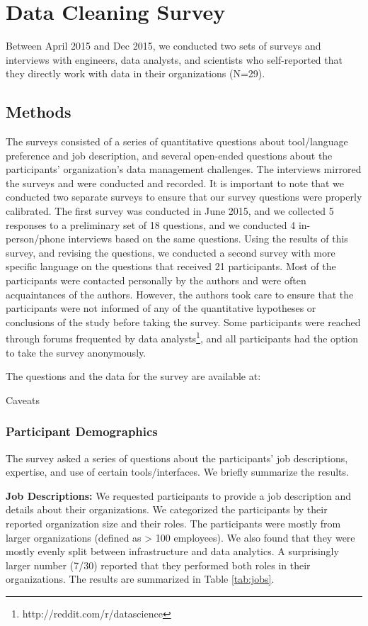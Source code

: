 \section{Data Cleaning Survey}
Between April 2015 and Dec 2015, we conducted two sets of surveys and interviews with engineers, data analysts, and scientists who self-reported that they directly work with data in their organizations (N=29).

\subsection{Methods}\label{sec:survey}
The surveys consisted of a series of quantitative questions about tool/language preference and job description, and several open-ended questions about the participants' organization's data management challenges. The interviews mirrored the surveys and were conducted and recorded. It is important to note that we conducted two separate surveys to ensure that our survey questions were properly calibrated. The first survey was conducted in June 2015, and we collected 5 responses to a preliminary set of 18 questions, and we conducted 4 in-person/phone interviews based on the same questions. Using the results of this survey, and revising the questions, we conducted a second survey with more specific language on the questions that received 21 participants. 
Most of the participants were contacted personally by the authors and were often acquaintances of the authors. However, the authors took care to ensure that the participants were not informed of any of the quantitative hypotheses or conclusions of the study before taking the survey. 
Some participants were reached through forums frequented by data analysts\footnote{http://reddit.com/r/datascience}, and all participants had the option to take the survey anonymously.

The questions and the data for the survey are available at: 
{}

Caveats

\subsubsection{Participant Demographics}
The survey asked a series of questions about the participants' job descriptions, expertise, and use of certain tools/interfaces.
We briefly summarize the results.

\vspace{0.5em}

\noindent\textbf{Job Descriptions: } We requested participants to provide a job description and details about their organizations. We categorized the participants by their reported organization size and their roles. The participants were mostly from larger organizations (defined as > 100 employees). We also found that they were mostly evenly split between infrastructure and data analytics. A surprisingly larger number (7/30) reported that they performed both roles in their organizations. The results are summarized in Table \ref{tab:jobs}. 


